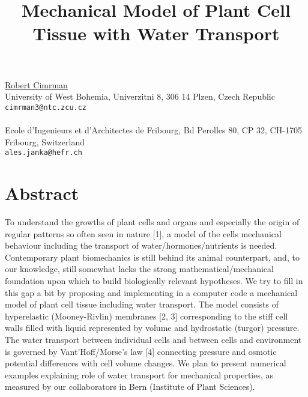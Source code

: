 \title{Mechanical Model of Plant Cell Tissue with Water Transport}
 \author{} \institute{}
\maketitle
\begin{center}
{\large \underline{Robert Cimrman}}\\
University of West Bohemia, Univerzitni 8, 306 14 Plzen, Czech Republic\\
{\tt cimrman3@ntc.zcu.cz}
\\ \vspace{4mm}{\large Ales Janka}\\
Ecole d'Ingenieurs et d'Architectes de Fribourg, Bd Perolles 80, CP 32, CH-1705 Fribourg, Switzerland\\
{\tt ales.janka@hefr.ch}

\end{center}

\section*{Abstract}

To understand the growths of plant cells and organs and especially the origin of regular patterns so often seen in nature [1], a model of the cells mechanical behaviour including the transport of water/hormones/nutrients is needed. Contemporary plant biomechanics is still behind its animal counterpart, and, to our knowledge, still somewhat lacks the strong mathematical/mechanical foundation upon which to build biologically relevant hypotheses. We try to fill in this gap a bit by proposing and implementing in a computer code a mechanical model of plant cell tissue including water transport. The model consists of hyperelastic (Mooney-Rivlin) membranes [2, 3] corresponding to the stiff cell walls filled with liquid represented by volume and hydrostatic (turgor) pressure. The water transport between individual cells and between cells and environment is governed by Vant'Hoff/Morse's law [4] connecting pressure and osmotic potential differences with cell volume changes. We plan to present numerical examples explaining role of water transport for mechanical properties, as measured by our collaborators in Bern (Institute of Plant Sciences).

